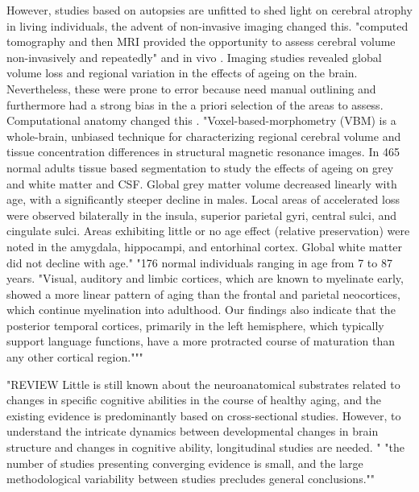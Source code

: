 \documentclass[twoside,onecolumn]{article}
\begin{document}
However, studies based on  autopsies are unfitted to shed light on cerebral atrophy in living individuals, the advent of non-invasive imaging changed this.
"computed tomography and then MRI provided the opportunity to assess cerebral volume non-invasively and repeatedly" and in vivo \cite{fox2004imaging}.
Imaging studies revealed global volume loss and regional variation in the effects of ageing on the brain. Nevertheless, these were prone to error because need manual outlining and furthermore had a strong bias in the a priori selection of the areas to assess.
Computational anatomy changed this \cite{ashburner2003computer}.
"Voxel-based-morphometry (VBM) is a whole-brain, unbiased technique for characterizing regional cerebral volume and tissue concentration differences in structural magnetic resonance images.  In 465 normal adults tissue based segmentation to study the effects of ageing on grey and white matter and CSF. Global grey matter volume decreased linearly with age, with a significantly steeper decline in males. Local areas of accelerated loss were observed bilaterally in the insula, superior parietal gyri, central sulci, and cingulate sulci. Areas exhibiting little or no age effect (relative preservation) were noted in the amygdala, hippocampi, and entorhinal cortex. Global white matter did not decline with age." \cite{good2001voxel}
"176 normal individuals ranging in age from 7 to 87 years.  "Visual, auditory and limbic cortices, which are known to myelinate early, showed a more linear pattern of aging than the frontal and parietal neocortices, which continue myelination into adulthood. Our findings also indicate that the posterior temporal cortices, primarily in the left hemisphere, which typically support language functions, have a more protracted course of maturation than any other cortical region."\cite{sowell2003mapping}""


"REVIEW Little is still known about the neuroanatomical substrates related to changes in specific cognitive abilities in the course of healthy aging, and the existing evidence is predominantly based on cross-sectional studies. However, to understand the intricate dynamics between developmental changes in brain structure and changes in cognitive ability, longitudinal studies are needed. " \cite{oschwald2019brain}  "the number of studies presenting converging evidence is small, and the large methodological variability between studies precludes general conclusions."" 
\end{document}
